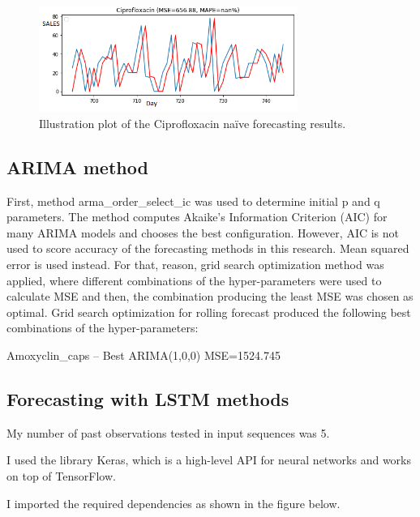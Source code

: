 \documentclass[12pt]{report}
\begin{document}
\begin{figure}[H]%
  \begin {center}
  \includegraphics[width=0.75\textwidth]{images/download (14)B.png}
  \caption{Illustration plot of the Ciprofloxacin naïve forecasting results.}
  \label{fig:ecg}
  \end {center}
\end{figure}


\subsection{ARIMA  method}


 First, method arma\_order\_select\_ic was used to determine initial p and q parameters. The method computes Akaike’s Information Criterion (AIC) for many ARIMA models and chooses the best configuration. However, AIC is not used to score accuracy of the forecasting methods in this research. Mean squared error is used instead. For that, reason, grid search optimization method was applied, where different combinations of the hyper-parameters were used to calculate MSE and then, the combination producing the least MSE was chosen as optimal. Grid search optimization for rolling forecast produced the following best combinations of the hyper-parameters:
 
Amoxyclin\_caps – Best ARIMA(1,0,0) MSE=1524.745


\subsection{Forecasting with LSTM methods}
My number of past observations tested in input sequences was 5.

I used the library Keras, which is a high-level API for neural networks and works on top of TensorFlow.

I imported the required dependencies as shown in the figure below.
\end{document}
